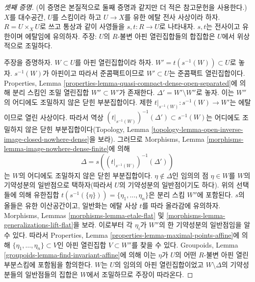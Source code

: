 \begin{proof}[셋째 증명]
(이 증명은 본질적으로 둘째 증명과 같지만 더 적은 참고문헌을 사용한다.)
$X$를 대수공간, $U$를 스킴이라 하고 $U \to X$를 유한 에탈 전사
사상이라 하자. $R = U \times_X U$로 쓰고 통상과 같이 사영들을
$s, t : R \to U$로 나타내자. $s, t$는 전사이고 유한이며
에탈임에 유의하자.
주장: $U$의 $R$-불변 아핀 열린집합들의 합집합은 $U$에서 위상적으로
조밀하다.

\medskip\noindent
주장을 증명하자. $W \subset U$를 아핀 열린집합이라 하자.
$W' = t(s^{-1}(W)) \subset U$로 놓자. $s^{-1}(W)$가 아핀이고
따라서 준콤팩트이므로 $W' \subset U$는 준콤팩트 열린집합이다.
Properties, Lemma
\ref{properties-lemma-quasi-compact-dense-open-separated}에 의해
분리 스킴인 조밀 열린집합 $W'' \subset W'$가 존재한다.
$\Delta' = W' \setminus W''$로 놓자. 이는 $W''$의 어디에도 조밀하지
않은 닫힌 부분집합이다. 제한
$t|_{s^{-1}(W)} : s^{-1}(W) \to W'$는 에탈이므로 열린 사상이다.
따라서 역상
$(t|_{s^{-1}(W)})^{-1}(\Delta') \subset s^{-1}(W)$는 어디에도
조밀하지 않은 닫힌 부분집합이다(Topology, Lemma
\ref{topology-lemma-open-inverse-image-closed-nowhere-dense}을 보라).
그러므로 Morphisms, Lemma
\ref{morphisms-lemma-image-nowhere-dense-finite}에 의해
$$
\Delta = s\left((t|_{s^{-1}(W)})^{-1}(\Delta')\right)
$$
는 $W$의 어디에도 조밀하지 않은 닫힌 부분집합이다.
$\eta \not \in \Delta$인 임의의 점 $\eta \in W$를 $W$의
기약성분의 일반점으로 택하자(따라서 $U$의 기약성분의 일반점이기도
하다). 위의 선택들에 의해 유한집합
$t(s^{-1}(\{\eta\})) = \{\eta_1, \ldots, \eta_n\}$은 분리 스킴
$W''$에 포함된다.
$s$의 올들은 유한 이산공간이고, 일반화는 에탈 사상 $t$를 따라
올라감에 유의하자. Morphisms, Lemmas
\ref{morphisms-lemma-etale-flat} 및
\ref{morphisms-lemma-generalizations-lift-flat}을 보라.
이로부터 각 $\eta_i$가 $W''$의 한 기약성분의 일반점임을 알 수 있다.
따라서 Properties, Lemma
\ref{properties-lemma-maximal-points-affine}에 의해
$\{\eta_1, \ldots, \eta_n\} \subset V$인 아핀 열린집합
$V \subset W''$를 찾을 수 있다. Groupoids, Lemma
\ref{groupoids-lemma-find-invariant-affine}에 의해 이는 $\eta$가
$U$의 어떤 $R$-불변 아핀 열린 부분스킴에 포함됨을 함의한다.
$W$는 $U$의 임의의 아핀 열린집합이었고
$W \setminus \Delta$의 기약성분들의 일반점들의 집합은 $W$에서
조밀하므로 주장이 따라온다.


\end{proof}
